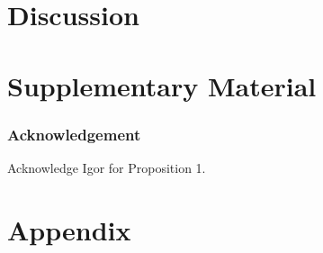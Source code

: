 \documentclass{article}[12pt]
\newcommand{\YY}{\mathcal{Y}}
\begin{document}
\section{Discussion}
\label{sec:disc}

\section*{Supplementary Material}



\subsubsection*{Acknowledgement}
Acknowledge Igor for Proposition 1.

\newpage 
\section*{Appendix}
\end{document}
